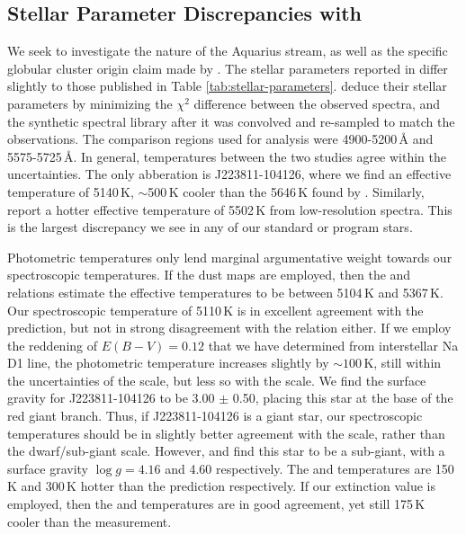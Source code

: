 \documentclass{emulateapj}
\begin{document}



\subsection{Stellar Parameter Discrepancies with \citet{wylie-de-boer;et-al_2012}}

We seek to investigate the nature of the Aquarius stream, as well as the specific globular cluster origin claim made by \citet{wylie-de-boer;et-al_2012}. The stellar parameters reported in \citet{wylie-de-boer;et-al_2012} differ slightly to those published in Table \ref{tab:stellar-parameters}. \citet{wylie-de-boer;et-al_2012} deduce their stellar parameters by minimizing the $\chi^2$ difference between the observed spectra, and the \citet{munari;et-al_2005} synthetic spectral library after it was convolved and re-sampled to match the observations. The comparison regions used for analysis were 4900-5200\,{\AA} and 5575-5725\,{\AA}. In general, temperatures between the two studies agree within the uncertainties. The only abberation is J223811-104126, where we find an effective temperature of 5140\,K, ${\sim}$500\,K cooler than the 5646\,K found by \citet{wylie-de-boer;et-al_2012}.  Similarly, \citet{williams;et-al_2011} report a hotter effective temperature of 5502\,K from low-resolution spectra. This is the largest discrepancy we see in any of our standard or program stars.

Photometric temperatures only lend marginal argumentative weight towards our spectroscopic temperatures. If the \citet{schlegel;et-al_1998} dust maps are employed, then the \citet{alonso;et-al_1999} and \citet{casagrande;et-al_2010} relations estimate the effective temperatures to be between 5104\,K and 5367\,K. Our spectroscopic temperature of 5110\,K is in excellent agreement with the \citet{alonso;et-al_1999} prediction, but not in strong disagreement with the \citet{casagrande;et-al_2010} relation either. If we employ the reddening of $E(B-V) = 0.12$ that we have determined from interstellar Na D1 line, the photometric temperature increases slightly by ${\sim}100$\,K, still within the uncertainties of the \citet{alonso;et-al_1999} scale, but less so  with the \citet{casagrande;et-al_2010} scale. We find the surface gravity for J223811-104126 to be 3.00 $\pm$ 0.50, placing this star at the base of the red giant branch. Thus, if J223811-104126 is a giant star, our spectroscopic temperatures should be in slightly better agreement with the \citet{alonso;et-al_1999} scale, rather than the \citet{casagrande;et-al_2010} dwarf/sub-giant scale. However, \citet{williams;et-al_2011} and \citet{wylie-de-boer;et-al_2012} find this star to be a sub-giant, with a surface gravity $\log{g} = 4.16$ and 4.60 respectively. The \citet{williams;et-al_2011} and \citet{wylie-de-boer;et-al_2012} temperatures are 150\,K and 300\,K hotter than the \citet{casagrande;et-al_2010} prediction respectively. If our extinction value is employed, then the \citet{williams;et-al_2011} and \citet{casagrande;et-al_2010} temperatures are in good agreement, yet still 175\,K cooler than the \citet{wylie-de-boer;et-al_2012} measurement.
\end{document}
